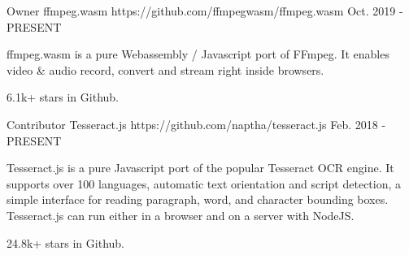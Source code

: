 

\begin{cventries}

  \cventry
    {Owner} %
    {ffmpeg.wasm} %
    {https://github.com/ffmpegwasm/ffmpeg.wasm} %
    {Oct. 2019 - PRESENT} %
    {
      \begin{cvitems} %
        \item {ffmpeg.wasm is a pure Webassembly / Javascript port of FFmpeg. It enables video \& audio record, convert and stream right inside browsers.}
        \item {6.1k+ stars in Github.}
      \end{cvitems}
    }

  \cventry
    {Contributor} %
    {Tesseract.js} %
    {https://github.com/naptha/tesseract.js} %
    {Feb. 2018 - PRESENT} %
    {
      \begin{cvitems} %
        \item {Tesseract.js is a pure Javascript port of the popular Tesseract OCR engine. It supports over 100 languages, automatic text orientation and script detection, a simple interface for reading paragraph, word, and character bounding boxes. Tesseract.js can run either in a browser and on a server with NodeJS.}
        \item {24.8k+ stars in Github.}
      \end{cvitems}
    }



\end{cventries}
